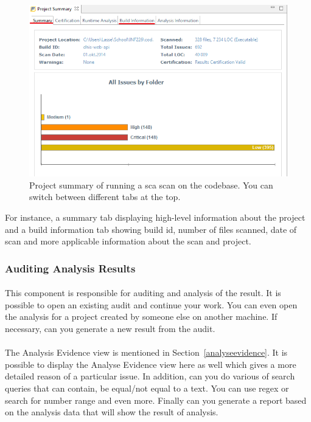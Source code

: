\documentclass[11pt,english,a4paper]{report}
\begin{document}
\begin{figure}[h]
    \centering
    \includegraphics[scale=0.65]{images/fortifysummary-sc.png}
    \caption{Project summary of running a \gls{sca} scan on the codebase. You can switch between different tabs at the top. }
    \label{fig:fortifysummaryscreenshot}
\end{figure}

For instance, a summary tab displaying high-level information about the project and a build information tab showing build id, number of files scanned, date of scan and more applicable information about the scan and project. \cite{installation-usage-guide}

\subsubsection{Auditing Analysis Results}
\paragraph{}
This component is responsible for auditing and analysis of the result.
It is possible to open an existing audit and continue your work.
You can even open the analysis for a project created by someone else on another machine.
If necessary, can you generate a new result from the audit. \cite{installation-usage-guide}

\paragraph{}
The Analysis Evidence view is mentioned in Section~\ref{analyseevidence}. 
It is possible to display the Analyse Evidence view here as well which gives a more detailed reason of a particular issue.
In addition, can you do various of search queries that can contain, be equal/not equal to a text.
You can use \gls{regex} or search for number range and even more. 
Finally can you generate a report based on the analysis data that will show the result of analysis. \cite{installation-usage-guide}
\end{document}
